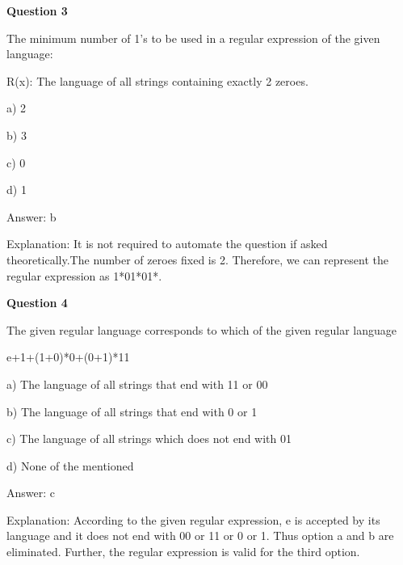 \documentclass{article}
\begin{document}
\begin{mdframed}[linewidth=1pt, roundcorner=5pt, linecolor=gray!30, backgroundcolor=gray!5]
\textbf{Question 3} 

The minimum number of 1's to be used in a regular expression of the given language:

R(x): The language of all strings containing exactly 2 zeroes.

a) 2

b) 3

c) 0

d) 1
\vspace{5pt} \par
\begin{tcolorbox}[colback=green!5, colframe=green!40!black, title=Solution]
Answer: b

Explanation: It is not required to automate the question if asked theoretically.The number of zeroes fixed is 2. Therefore, we can represent the regular expression as 1*01*01*.
\end{tcolorbox}
\end{mdframed}
\newpage

\begin{mdframed}[linewidth=1pt, roundcorner=5pt, linecolor=gray!30, backgroundcolor=gray!5]
\textbf{Question 4} 

The given regular language corresponds to which of the given regular language

e+1+(1+0)*0+(0+1)*11

a) The language of all strings that end with 11 or 00

b) The language of all strings that end with 0 or 1

c) The language of all strings which does not end with 01

d) None of the mentioned
\vspace{5pt} \par
\begin{tcolorbox}[colback=green!5, colframe=green!40!black, title=Solution]
Answer: c

Explanation: According to the given regular expression, e is accepted by its language and it does not end with 00 or 11 or 0 or 1. Thus option a and b are eliminated. Further, the regular expression is valid for the third option.
\end{tcolorbox}
\end{mdframed}
\end{document}
